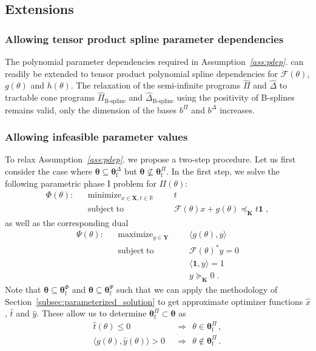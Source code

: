 \documentclass{article}
\DeclareMathOperator*{\minimize}{minimize}
\DeclareMathOperator*{\maximize}{maximize}
\DeclareMathOperator*{\subj}{subject\;to}
\newcommand{\R}{\mathbb{R}}         %
\newcommand{\adj}{\ast}                     %
\newcommand{\feas}{\mathrm{f}}              %
\newcommand{\ppar}{\theta}                          %
\newcommand{\Ppar}{{\bm{\theta}}}                   %
\newcommand{\X}{\mathbf{X}}                         %
\newcommand{\Y}{\mathbf{Y}}                         %
\newcommand{\K}{\mathbf{K}}                         %
\newcommand{\calF}{\mathcal{F}}                     %
\newcommand{\Pfeas}{\Ppar^\Pi_\feas}                %
\newcommand{\Dfeas}{\Ppar^\Delta_\feas}             %
\newcommand{\bPi}{b^\Pi}                %
\newcommand{\bDelta}{b^\Delta}          %
\begin{document}

\subsection{Extensions}\label{subsec:extensions}

\subsubsection{Allowing tensor product spline parameter dependencies}

The polynomial parameter dependencies required in  Assumption~{\it{}\ref{ass:pdep}.} can readily be extended to tensor product polynomial spline dependencies for $\calF(\ppar)$, $g(\ppar)$ and $h(\ppar)$. The relaxation of the semi-infinite programs $\hat{\Pi}$ and $\hat{\Delta}$ to tractable cone programs $\hat{\Pi}_{\text{B-spline}}$ and $\hat{\Delta}_{\text{B-spline}}$ using the positivity of B-splines remains valid, only the dimension of the bases $\bPi$ and $\bDelta$ increases.

\subsubsection{Allowing infeasible parameter values}%

To relax Assumption~{\it{}\ref{ass:pdep}.} we propose a two-step procedure. Let us first consider the case where $\Ppar\subseteq\Dfeas$ but $\Ppar\nsubseteq\Pfeas$. In the first step, we solve the following parametric phase I problem for $\Pi(\ppar)$:
\[ \begin{aligned}
\Phi(\ppar): && \minimize_{x\in\X, t\in\R} &&& t \\%
             && \subj                      &&& \calF(\ppar)x + g(\ppar)\preceq_\K t \mathbf{1} \;,%
\end{aligned} \]
as well as the corresponding dual
\[ \begin{aligned}
\Psi(\ppar): && \maximize_{y\in\Y} &&& \langle g(\ppar), y \rangle \\%
             && \subj              &&& \calF(\ppar)^\adj y = 0 \\%
             &&                    &&& \langle \mathbf{1}, y \rangle = 1\\%
             &&                    &&& y \succeq_\K 0 \;.%
\end{aligned} \]
Note that $\Ppar\subseteq\Ppar^\Phi_\feas$ and $\Ppar\subseteq\Ppar^\Psi_\feas$ such that we can apply the methodology of Section~\ref{subsec:parameterized_solution} to get approximate optimizer functions $\hat{x}$, $\hat{t}$ and $\hat{y}$. These allow us to determine $\Pfeas\subset\Ppar$ as
\[ \begin{aligned}
\hat{t}(\ppar) \leq 0 &~~\Rightarrow~~ \ppar\in\Pfeas \,,\\
\langle g(\ppar), \hat{y}(\ppar) \rangle > 0 &~~\Rightarrow~~ \ppar\notin\Pfeas\,.%
\end{aligned}\]
\end{document}
